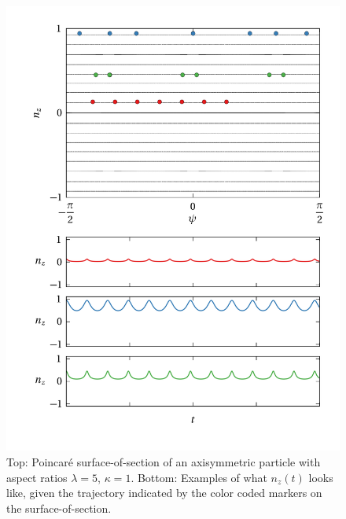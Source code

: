 \documentclass[thesis.tex]{subfiles}
\begin{document}
\begin{figure}
\centering
\includegraphics[width=12cm]{figs/poincare1o00.png}%
\caption{\label{fig:poincare1o00} Top: Poincar\'e surface-of-section of an axisymmetric particle with aspect ratios $\lambda=5$, $\kappa=1$. Bottom: Examples of what $n_z(t)$ looks like, given the trajectory indicated by the color coded markers on the surface-of-section. 
}
\end{figure}
\end{document}
